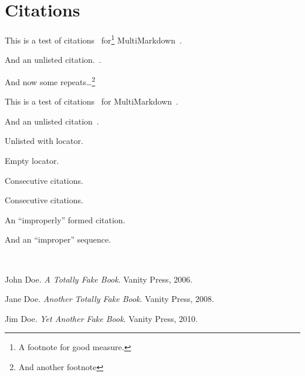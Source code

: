 
\def\mytitle{MultiMarkdown Citation Test}
\def\bibliocommand{}

\part{Citations}
\label{citations}

This is a test of citations~\citep{first} for\footnote{A footnote for good measure.} MultiMarkdown~\citep{second}.

And an unlisted citation.~\citep{Author:1988}.

And now some repeats{\ldots}\footnote{And another footnote}

This is a test of citations~\citep[p. 123]{first} for MultiMarkdown~\citep{second}.

And an unlisted citation~\citep{Author:1988}.

Unlisted with locator.~\citep[test]{Author:1988}

Empty locator.~\citep{first}

Consecutive citations.~\citep{first}~\citep{second}

Consecutive citations.~\citep{first}~\citep{second}

An ``improperly'' formed citation.~\citep{second}

And an ``improper'' sequence.~\citep{first}~\citep{second}

~\nocite{third}

\begin{thebibliography}{0}

John Doe. \emph{A Totally Fake Book}. Vanity Press, 2006.


Jane Doe. \emph{Another Totally Fake Book}. Vanity Press, 2008.


Jim Doe. \emph{Yet Another Fake Book}. Vanity Press, 2010.


\end{thebibliography}




